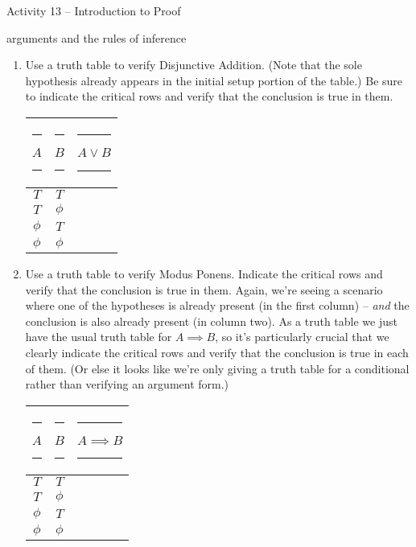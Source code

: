 \documentclass{amsart}
\begin{document}
\thispagestyle{empty}

\centerline{\Large Activity 13 -- Introduction to Proof}
\centerline{\large arguments and the rules of inference}

\bigskip
\Large


\begin{enumerate}

\item Use a truth table to verify Disjunctive Addition. (Note that the sole hypothesis already appears in the initial setup portion of the table.) Be sure to indicate the critical rows and verify that the conclusion is true in them.

\vspace{.2in}

\begin{tabular}{c|c||c}
\rule[-6pt]{0pt}{24pt} \rule{8pt}{0pt} $A$ \rule{8pt}{0pt} & \rule{8pt}{0pt} $B$ \rule{8pt}{0pt} & \rule{8pt}{0pt} $A \lor B$ \rule{8pt}{0pt}  \\ \hline
\rule[-6pt]{0pt}{24pt} $T$    & $T$    & \\
\rule[-6pt]{0pt}{24pt} $T$    & $\phi$ & \\
\rule[-6pt]{0pt}{24pt} $\phi$ & $T$    & \\
\rule[-6pt]{0pt}{24pt} $\phi$ & $\phi$ & \\
\end{tabular}

\vfill

\item Use a truth table to verify Modus Ponens.  Indicate the critical rows and verify that the conclusion is true in them.
Again, we're seeing a scenario where one of the hypotheses is already present (in the first column) -- {\em and} the conclusion is also already present (in column two).  As a truth table we just have the usual truth table for $A \implies B$, so it's particularly crucial that we clearly indicate the critical rows and verify that the conclusion is true in each of them. (Or else it looks like we're only giving a truth table for a conditional rather than verifying an argument form.)

\vspace{.2in}

\begin{tabular}{c|c||c}
\rule[-6pt]{0pt}{24pt} \rule{8pt}{0pt} $A$ \rule{8pt}{0pt} & \rule{8pt}{0pt} $B$ \rule{8pt}{0pt} & \rule{8pt}{0pt} $A \implies B$ \rule{8pt}{0pt}  \\ \hline
\rule[-6pt]{0pt}{24pt} $T$    & $T$    & \\
\rule[-6pt]{0pt}{24pt} $T$    & $\phi$ & \\
\rule[-6pt]{0pt}{24pt} $\phi$ & $T$    & \\
\rule[-6pt]{0pt}{24pt} $\phi$ & $\phi$ & \\
\end{tabular}


\end{enumerate}
\end{document}
